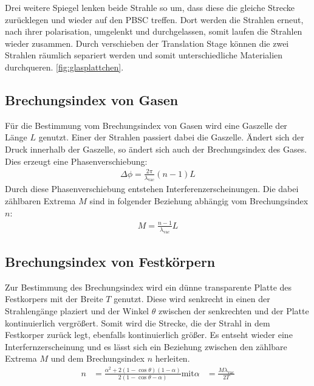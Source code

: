 Drei weitere Spiegel lenken beide Strahle so um, dass diese die gleiche Strecke zurücklegen und wieder auf
den PBSC treffen. Dort werden die Strahlen erneut, nach ihrer polarisation,
umgelenkt und durchgelassen, somit laufen die Strahlen wieder zusammen.
Durch verschieben der Translation Stage können die zwei Strahlen räumlich separiert
werden und somit unterschiedliche Materialien durchqueren.
\ref{fig:glasplattchen}.


\subsection{Brechungsindex von Gasen}
Für die Bestimmung vom Brechungsindex von Gasen wird eine Gaszelle
der Länge $L$ genutzt. Einer der Strahlen passiert dabei die Gaszelle.
Ändert sich der Druck innerhalb der Gaszelle, so ändert sich auch
der Brechungsindex des Gases. Dies erzeugt eine Phasenverschiebung:
\begin{align}
  \Delta\phi=\frac{2\pi}{\lambda_\mathrm{vac}}(n-1)L
\end{align}
Durch diese Phasenverschiebung entstehen Interferenzerscheinungen.
Die dabei zählbaren Extrema $M$ sind in folgender Beziehung abhängig
vom Brechungsindex $n$:
\begin{align}
  M=\frac{n-1}{\lambda_\mathrm{vac}}L\label{eqn:gas}
\end{align}
\subsection{Brechungsindex von Festkörpern}
Zur Bestimmung des Brechungsindex wird ein dünne transparente
Platte des Festkorpers mit der Breite $T$ genutzt. Diese wird senkrecht in einen der Strahlengänge
plaziert und der Winkel $\theta$ zwischen der senkrechten und der Platte kontinuierlich vergrößert. Somit wird die Strecke,
die der Strahl in dem Festkorper zurück legt, ebenfalls kontinuierlich größer.
Es entseht wieder eine Interfernzerscheinung
und es lässt sich ein Beziehung zwischen den zählbare Extrema $M$
und dem Brechungsindex $n$ herleiten.
\begin{align}%
  n&=\frac{\alpha^2+2(1-\cos\theta)(1-\alpha)}{2(1-\cos\theta-\alpha)}
  \text{mit} \alpha&= \frac{M\lambda_\mathrm{vac}}{2T}
\end{align}
